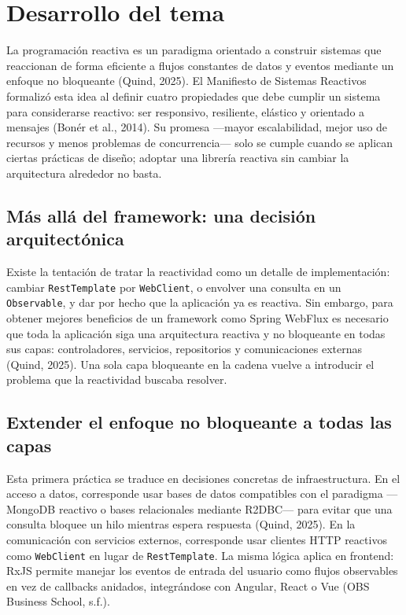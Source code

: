 \documentclass[
  spanish,
  12pt,
  letterpaper,
]{article}
\begin{document}
\section{Desarrollo del tema}\label{desarrollo-del-tema}

La programación reactiva es un paradigma orientado a construir sistemas
que reaccionan de forma eficiente a flujos constantes de datos y eventos
mediante un enfoque no bloqueante (Quind, 2025). El Manifiesto de
Sistemas Reactivos formalizó esta idea al definir cuatro propiedades que
debe cumplir un sistema para considerarse reactivo: ser responsivo,
resiliente, elástico y orientado a mensajes (Bonér et al., 2014). Su
promesa ---mayor escalabilidad, mejor uso de recursos y menos problemas
de concurrencia--- solo se cumple cuando se aplican ciertas prácticas de
diseño; adoptar una librería reactiva sin cambiar la arquitectura
alrededor no basta.

\subsection{Más allá del framework: una decisión
arquitectónica}\label{muxe1s-alluxe1-del-framework-una-decisiuxf3n-arquitectuxf3nica}

Existe la tentación de tratar la reactividad como un detalle de
implementación: cambiar \texttt{RestTemplate} por \texttt{WebClient}, o
envolver una consulta en un \texttt{Observable}, y dar por hecho que la
aplicación ya es reactiva. Sin embargo, para obtener mejores beneficios
de un framework como Spring WebFlux es necesario que toda la aplicación
siga una arquitectura reactiva y no bloqueante en todas sus capas:
controladores, servicios, repositorios y comunicaciones externas (Quind,
2025). Una sola capa bloqueante en la cadena vuelve a introducir el
problema que la reactividad buscaba resolver.

\subsection{Extender el enfoque no bloqueante a todas las
capas}\label{extender-el-enfoque-no-bloqueante-a-todas-las-capas}

Esta primera práctica se traduce en decisiones concretas de
infraestructura. En el acceso a datos, corresponde usar bases de datos
compatibles con el paradigma ---MongoDB reactivo o bases relacionales
mediante R2DBC--- para evitar que una consulta bloquee un hilo mientras
espera respuesta (Quind, 2025). En la comunicación con servicios
externos, corresponde usar clientes HTTP reactivos como
\texttt{WebClient} en lugar de \texttt{RestTemplate}. La misma lógica
aplica en frontend: RxJS permite manejar los eventos de entrada del
usuario como flujos observables en vez de callbacks anidados,
integrándose con Angular, React o Vue (OBS Business School, s.f.).
\end{document}
